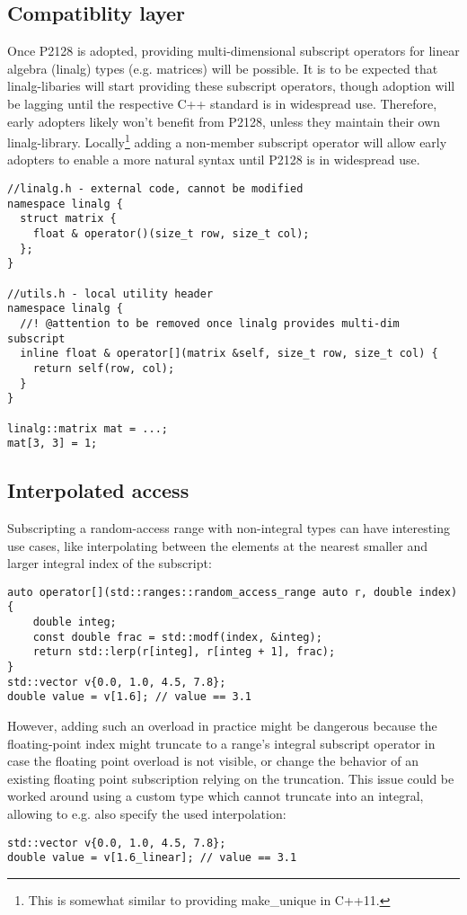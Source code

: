 \subsection{Compatiblity layer}
Once P2128 is adopted, providing multi\hyp dimensional subscript operators for linear algebra (linalg) types (e.g. matrices) will be possible.
It is to be expected that linalg\hyp libaries will start providing these subscript operators, though adoption will be lagging until the respective C++ standard is in widespread use.
Therefore, early adopters likely won't benefit from P2128, unless they maintain their own linalg\hyp library.
Locally\footnote{This is somewhat similar to providing make_unique in C++11.} adding a non\hyp member subscript operator will allow early adopters to enable a more natural syntax until P2128 is in widespread use.

\begin{lstlisting}[style=Vc]
//linalg.h - external code, cannot be modified
namespace linalg {
  struct matrix {
    float & operator()(size_t row, size_t col);
  };
}

//utils.h - local utility header
namespace linalg {
  //! @attention to be removed once linalg provides multi-dim subscript
  inline float & operator[](matrix &self, size_t row, size_t col) {
    return self(row, col);
  }
}

linalg::matrix mat = ...;
mat[3, 3] = 1;

\end{lstlisting}

\subsection{Interpolated access}
Subscripting a random-access range with non-integral types can have interesting use cases,
like interpolating between the elements at the nearest smaller and larger integral index of the subscript:
\smallskip\begin{lstlisting}
auto operator[](std::ranges::random_access_range auto r, double index) {
    double integ;
    const double frac = std::modf(index, &integ);
    return std::lerp(r[integ], r[integ + 1], frac);
}
std::vector v{0.0, 1.0, 4.5, 7.8};
double value = v[1.6]; // value == 3.1
\end{lstlisting}
However, adding such an overload in practice might be dangerous because the floating-point index might truncate to a range's integral subscript operator in case the floating point overload is not visible, or change the behavior of an existing floating point subscription relying on the truncation.
This issue could be worked around using a custom type which cannot truncate into an integral, allowing to e.g. also specify the used interpolation:
\smallskip\begin{lstlisting}
std::vector v{0.0, 1.0, 4.5, 7.8};
double value = v[1.6_linear]; // value == 3.1
\end{lstlisting}

